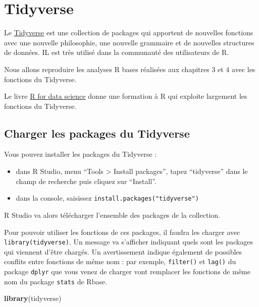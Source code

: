 \documentclass[
]{book}
\newenvironment{Shaded}{\begin{snugshade}}{\end{snugshade}}
\newcommand{\FunctionTok}[1]{\textcolor[rgb]{0.13,0.29,0.53}{\textbf{#1}}}
\newcommand{\NormalTok}[1]{#1}
\providecommand{\tightlist}{%
  \setlength{\itemsep}{0pt}\setlength{\parskip}{0pt}}
\begin{document}
\chapter{Tidyverse}\label{tidyverse}

Le \href{https://www.tidyverse.org/}{Tidyverse} est une collection de packages qui apportent de nouvelles fonctions avec une nouvelle philosophie, une nouvelle grammaire et de nouvelles structures de données. IL est très utilisé dans la communauté des utilisateurs de R.

Nous allons reproduire les analyses R bases réalisées aux chapitres 3 et 4 avec les fonctions du Tidyverse.

Le livre \href{https://r4ds.hadley.nz/}{R for data science} donne une formation à R qui exploite largement les fonctions du Tidyverse.

\section{Charger les packages du Tidyverse}\label{charger-les-packages-du-tidyverse}

Vous pouvez installer les packages du Tidyverse :

\begin{itemize}
\tightlist
\item
  dans R Studio, menu ``Tools \textgreater{} Install packages'', tapez ``tidyverse'' dans le champ de recherche puis cliquez sur ``Install''.
\item
  dans la console, saisissez \texttt{install.packages("tidyverse")}
\end{itemize}

R Studio va alors télécharger l'ensemble des packages de la collection.

Pour pouvoir utiliser les fonctions de ces packages, il faudra les charger avec \texttt{library(tidyverse)}. Un message va s'afficher indiquant quels sont les packages qui viennent d'être chargés. Un avertissement indique également de possibles conflits entre fonctions de même nom : par exemple, \texttt{filter()} et \texttt{lag()} du package \texttt{dplyr} que vous venez de charger vont remplacer les fonctions de même nom du package \texttt{stats} de Rbase.

\begin{Shaded}
\begin{Highlighting}[]
\FunctionTok{library}\NormalTok{(tidyverse)}
\end{Highlighting}
\end{Shaded}
\end{document}
